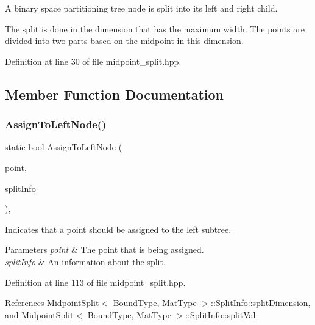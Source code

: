 A binary space partitioning tree node is split into its left and right child. 

The split is done in the dimension that has the maximum width. The points are divided into two parts based on the midpoint in this dimension. 

Definition at line 30 of file midpoint\+\_\+split.\+hpp.



\subsection{Member Function Documentation}
\mbox{\label{classmlpack_1_1tree_1_1MidpointSplit_af0fc61f469596cb8796d1966564ecbcb}} 
\subsubsection{Assign\+To\+Left\+Node()}
{\footnotesize\ttfamily static bool Assign\+To\+Left\+Node (\begin{DoxyParamCaption}\item[{const Vec\+Type \&}]{point,  }\item[{const \textbf{ Split\+Info} \&}]{split\+Info }\end{DoxyParamCaption})\hspace{0.3cm}{\ttfamily [inline]}, {\ttfamily [static]}}



Indicates that a point should be assigned to the left subtree. 


\begin{DoxyParams}{Parameters}
{\em point} & The point that is being assigned. \\
\hline
{\em split\+Info} & An information about the split. \\
\hline
\end{DoxyParams}


Definition at line 113 of file midpoint\+\_\+split.\+hpp.



References Midpoint\+Split$<$ Bound\+Type, Mat\+Type $>$\+::\+Split\+Info\+::split\+Dimension, and Midpoint\+Split$<$ Bound\+Type, Mat\+Type $>$\+::\+Split\+Info\+::split\+Val.

\mbox{\label{classmlpack_1_1tree_1_1MidpointSplit_aace8240352cb3ea61c975987b91a80a6}} 
